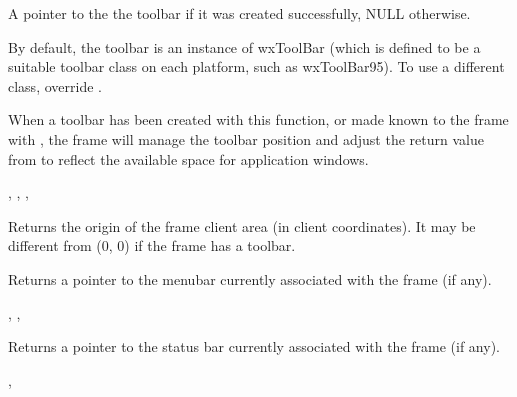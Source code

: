 A pointer to the the toolbar if it was created successfully, NULL otherwise.


By default, the toolbar is an instance of wxToolBar (which is defined to be
a suitable toolbar class on each platform, such as wxToolBar95). To use a different class,
override .

When a toolbar has been created with this function, or made known to the frame
with , the frame will manage the toolbar
position and adjust the return value from  to
reflect the available space for application windows.


,\rtfsp
{},\rtfsp
{},\rtfsp
{}

\label{wxframegetclientareaorigin}


Returns the origin of the frame client area (in client coordinates). It may be
different from (0, 0) if the frame has a toolbar.

\label{wxframegetmenubar}


Returns a pointer to the menubar currently associated with the frame (if any).


, , 

\label{wxframegetstatusbar}


Returns a pointer to the status bar currently associated with the frame (if any).


, 

\label{wxframegetstatusbarpane}

